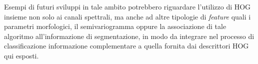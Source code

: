 Esempi di futuri sviluppi in tale ambito potrebbero riguardare l'utilizzo di HOG insieme non solo ai canali spettrali, ma anche ad altre tipologie di \emph{feature} quali i parametri morfologici, il semivariogramma oppure la associazione di tale algoritmo all'informazione di segmentazione, in modo da integrare nel processo di classificazione informazione complementare a quella fornita dai descrittori HOG qui esposti.


